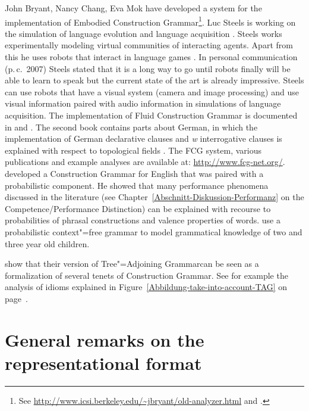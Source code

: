 John Bryant, Nancy Chang, Eva Mok
have developed a system for the implementation of Embodied Construction Grammar\footnote{%
  See \url{http://www.icsi.berkeley.edu/~jbryant/old-analyzer.html} and .
}.
Luc Steels is working on the simulation of language evolution and language acquisition
\citep{Steels2003a}. Steels works experimentally modeling virtual communities of interacting
agents. Apart from this he uses robots that interact in language games \citep{Steels2015a-u}.
In personal communication (p.\,c.\ 2007) %
Steels stated that it is a long way to go until robots finally will be able to learn to speak but the
current state of the art is already impressive. Steels can use robots that have a visual system
(camera and image processing) and use visual information paired with audio information in
simulations of language acquisition. The implementation of Fluid Construction Grammar is documented in
 and . The second book contains parts about
German, in which the implementation of German declarative clauses and \emph{w} interrogative clauses
is explained with respect to topological fields \citep{Micelli2012a}. The FCG system, various
publications and example analyses are available at: \url{http://www.fcg-net.org/}.
\citet{Jurafsky96a} developed a Construction Grammar for English that was paired with a
probabilistic component. He showed that many performance phenomena
discussed in the literature (see Chapter~\ref{Abschnitt-Diskussion-Performanz} on
the Competence/Performance Distinction) can be explained with recourse to probabilities of phrasal
constructions and valence properties of words.
\citet*{BLT2009a} use a probabilistic context"=free grammar to model grammatical knowledge of two and three year old children.

\citet{LK2017a} show that their version of Tree"=Adjoining Grammar\indextag can be seen as a
formalization of several tenets of Construction Grammar. See for example the analysis of idioms
explained in Figure~\ref{Abbildung-take-into-account-TAG} on page~\pageref{Abbildung-take-into-account-TAG}.

\section{General remarks on the representational format}


